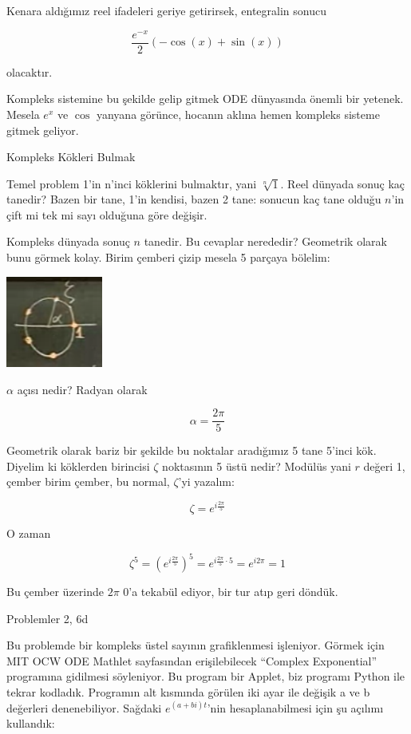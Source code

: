 \documentclass[12pt,fleqn]{article}\usepackage{../../common}
\begin{document}
Kenara aldığımız reel ifadeleri geriye getirirsek, entegralin sonucu

$$ \frac{e^{-x}}{2}(-\cos(x) + \sin(x)) $$

olacaktır. 

Kompleks sistemine bu şekilde gelip gitmek ODE dünyasında önemli bir
yetenek. Mesela $e^{x}$ ve $\cos$ yanyana görünce, hocanın aklına hemen
kompleks sisteme gitmek geliyor. 

Kompleks Kökleri Bulmak

Temel problem 1'in n'inci köklerini bulmaktır, yani $\sqrt[n]{1}$. Reel
dünyada sonuç kaç tanedir? Bazen bir tane, 1'in kendisi, bazen 2 tane:
sonucun kaç tane olduğu $n$'in çift mi tek mi sayı olduğuna göre değişir.

Kompleks dünyada sonuç $n$ tanedir. Bu cevaplar nerededir? Geometrik olarak
bunu görmek kolay. Birim çemberi çizip mesela 5 parçaya bölelim:

\includegraphics[height=3cm]{6_5.png}

$\alpha$ açısı nedir? Radyan olarak 

$$ \alpha = \frac{2\pi}{5} $$

Geometrik olarak bariz bir şekilde bu noktalar aradığımız 5 tane 5'inci
kök. Diyelim ki köklerden birincisi $\zeta$ noktasının 5 üstü nedir?
Modülüs yani $r$ değeri 1, çember birim çember, bu normal, $\zeta$'yi yazalım:

$$ \zeta = e^{i\frac{2\pi}{5}} $$

O zaman

$$ 
\zeta^5 = (e^{i\frac{2\pi}{5}})^5 = e^{i\frac{2\pi}{5} \cdot 5} = e^{i2\pi} =
1 
$$

Bu çember üzerinde $2\pi$ 0'a tekabül ediyor, bir tur atıp geri döndük. 

Problemler 2, 6d

Bu problemde bir kompleks üstel sayının grafiklenmesi işleniyor. Görmek
için MIT OCW ODE Mathlet sayfasından erişilebilecek ``Complex Exponential''
programına gidilmesi söyleniyor. Bu program bir Applet, biz programı Python
ile tekrar kodladık. Programın alt kısmında görülen iki ayar ile değişik a
ve b değerleri denenebiliyor. Sağdaki $e^{(a+bi)t}$'nin hesaplanabilmesi
için şu açılımı kullandık:
\end{document}
